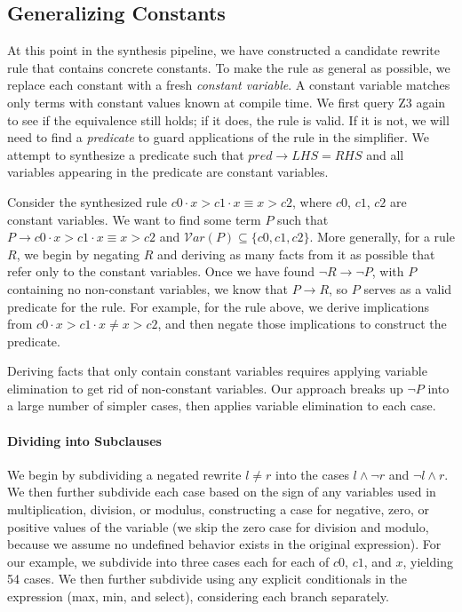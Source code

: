 \documentclass[sigplan,10pt,review,anonymous]{acmart}\settopmatter{printfolios=true,printccs=false,printacmref=false}
\begin{document}
\subsection{Generalizing Constants}

At this point in the synthesis pipeline, we have constructed a candidate rewrite
rule that contains concrete constants.  To make the rule as general as possible,
we replace each constant with a fresh \emph{constant variable}. A constant
variable matches only terms with constant values known at compile time. We first query Z3
again to see if the equivalence still holds; if it does, the rule is valid. If
it is not, we will need to find a \textit{predicate} to guard
applications of the rule in the simplifier. We attempt to synthesize a predicate
such that $pred \rightarrow LHS = RHS$ and all variables appearing in the
predicate are constant variables.

Consider the synthesized rule $c0 \cdot x > c1 \cdot x \equiv x > c2$, where $c0$, $c1$,
$c2$ are constant variables. We want to find some term $P$ such that
$P \rightarrow c0 \cdot x > c1 \cdot x \equiv x > c2$ and
$\mathcal{V}ar(P) \subseteq \{c0, c1, c2\}$. More generally, for a rule $R$, we begin by
negating $R$ and deriving as many facts from it as possible that refer only to
the constant variables. Once we have found $\neg R \rightarrow \neg P$, with $P$ containing
no non-constant variables, we know that $P \rightarrow R$, so $P$ serves as a
valid predicate for the rule.  For example, for the rule above, we derive implications
from $c0 \cdot x > c1 \cdot x \neq x > c2$, and then negate those implications to
construct the predicate.

Deriving facts that only contain constant variables requires applying variable
elimination to get rid of non-constant variables.  Our approach breaks up $\neg P$ into
a large number of simpler cases, then applies variable elimination to each case.

\paragraph{Dividing into Subclauses} We begin by subdividing a negated rewrite $l \neq r$ into
the cases $l \wedge \neg r$ and $\neg l \wedge r$.  We then further subdivide each case based
on the sign of any variables used in multiplication, division, or modulus, constructing
a case for negative, zero, or positive values of the variable (we skip the zero case for
division and modulo, because we assume no undefined behavior exists in the original expression).
For our example, we subdivide into three cases each for each of $c0$, $c1$, and $x$, yielding
54 cases.  We then further subdivide using any explicit conditionals in the expression (max,
min, and select), considering each branch separately.
\end{document}
